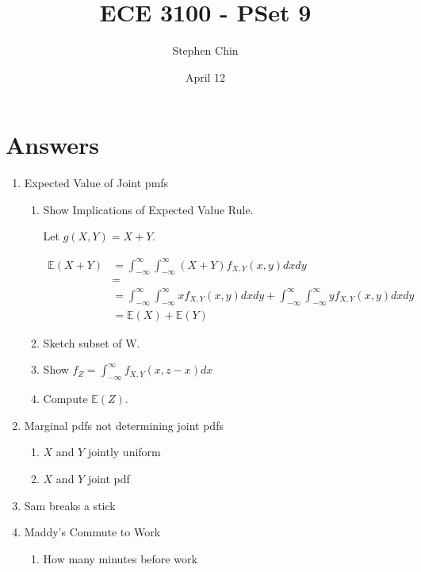 \documentclass{article}
\title{ECE 3100 - PSet 9}
\author{Stephen Chin}
\date{April 12}
\begin{document}
\maketitle

\section{Answers}

\begin{enumerate}
\item Expected Value of Joint pmfs
  \begin{enumerate}
  \item Show Implications of Expected Value Rule.

    Let $g(X,Y) = X + Y$.
    
    \[
      \begin{aligned}
        \mathbb{E}(X + Y) &= \int_{-\infty}^{\infty}
        \int_{-\infty}^{\infty} (X + Y) f_{X,Y} (x,y) dx dy \\
        &= \\
        &= \int_{-\infty}^{\infty} \int_{-\infty}^{\infty} xf_{X,Y}(x,y)dx
        dy + \int_{-\infty}^{\infty} \int_{-\infty}^{\infty}
        yf_{X,Y}(x,y) dx dy\\
        &= \mathbb{E}(X) + \mathbb{E}(Y)
      \end{aligned}
    \]

  \item Sketch subset of W.

  \item Show $f_Z = \int_{-\infty}^{\infty} f_{X,Y}(x,z-x) dx$

  \item Compute $\mathbb{E}(Z)$.
    
  \end{enumerate}

\item Marginal pdfs not determining joint pdfs
  \begin{enumerate}
  \item $X$ and $Y$ jointly uniform

  \item $X$ and $Y$ joint pdf

  \end{enumerate}

\item Sam breaks a stick

\item Maddy's Commute to Work
  \begin{enumerate}
  \item How many minutes before work


\end{enumerate}
\end{enumerate}
\end{document}
